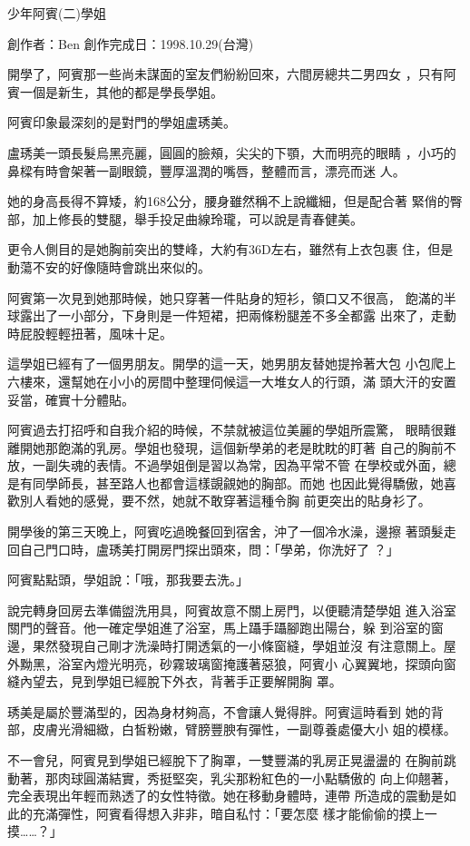 



少年阿賓(二)學姐

創作者：Ben
創作完成日：1998.10.29(台灣)


開學了，阿賓那一些尚未謀面的室友們紛紛回來，六間房總共二男四女
，只有阿賓一個是新生，其他的都是學長學姐。

阿賓印象最深刻的是對門的學姐盧琇美。

盧琇美一頭長髮烏黑亮麗，圓圓的臉頰，尖尖的下顎，大而明亮的眼睛
，小巧的鼻樑有時會架著一副眼鏡，豐厚溫潤的嘴唇，整體而言，漂亮而迷
人。

她的身高長得不算矮，約168公分，腰身雖然稱不上說纖細，但是配合著
緊俏的臀部，加上修長的雙腿，舉手投足曲線玲瓏，可以說是青春健美。

更令人側目的是她胸前突出的雙峰，大約有36D左右，雖然有上衣包裹
住，但是動蕩不安的好像隨時會跳出來似的。

阿賓第一次見到她那時候，她只穿著一件貼身的短衫，領口又不很高，
飽滿的半球露出了一小部分，下身則是一件短裙，把兩條粉腿差不多全都露
出來了，走動時屁股輕輕扭著，風味十足。

這學姐已經有了一個男朋友。開學的這一天，她男朋友替她提拎著大包
小包爬上六樓來，還幫她在小小的房間中整理伺候這一大堆女人的行頭，滿
頭大汗的安置妥當，確實十分體貼。

阿賓過去打招呼和自我介紹的時候，不禁就被這位美麗的學姐所震驚，
眼睛很難離開她那飽滿的乳房。學姐也發現，這個新學弟的老是眈眈的盯著
自己的胸前不放，一副失魂的表情。不過學姐倒是習以為常，因為平常不管
在學校或外面，總是有同學師長，甚至路人也都會這樣覬覦她的胸部。而她
也因此覺得驕傲，她喜歡別人看她的感覺，要不然，她就不敢穿著這種令胸
前更突出的貼身衫了。

開學後的第三天晚上，阿賓吃過晚餐回到宿舍，沖了一個冷水澡，邊擦
著頭髮走回自己門口時，盧琇美打開房門探出頭來，問：「學弟，你洗好了
？」

阿賓點點頭，學姐說：「哦，那我要去洗。」

說完轉身回房去準備盥洗用具，阿賓故意不關上房門，以便聽清楚學姐
進入浴室關門的聲音。他一確定學姐進了浴室，馬上躡手躡腳跑出陽台，躲
到浴室的窗邊，果然發現自己剛才洗澡時打開透氣的一小條窗縫，學姐並沒
有注意關上。屋外黝黑，浴室內燈光明亮，砂霧玻璃窗掩護著惡狼，阿賓小
心翼翼地，探頭向窗縫內望去，見到學姐已經脫下外衣，背著手正要解開胸
罩。

琇美是屬於豐滿型的，因為身材夠高，不會讓人覺得胖。阿賓這時看到
她的背部，皮膚光滑細緻，白皙粉嫩，臂膀豐腴有彈性，一副尊養處優大小
姐的模樣。

不一會兒，阿賓見到學姐已經脫下了胸罩，一雙豐滿的乳房正晃盪盪的
在胸前跳動著，那肉球圓滿結實，秀挺堅突，乳尖那粉紅色的一小點驕傲的
向上仰翹著，完全表現出年輕而熟透了的女性特徵。她在移動身體時，連帶
所造成的震動是如此的充滿彈性，阿賓看得想入非非，暗自私忖：「要怎麼
樣才能偷偷的摸上一摸……？」

